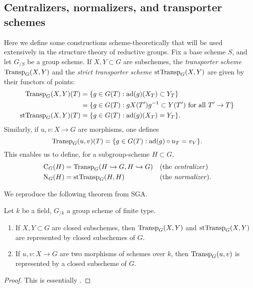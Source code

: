 \subsection{Centralizers, normalizers, and transporter schemes}

Here we define some constructions scheme-theoretically that will be used 
extensively in the structure theory of reductive groups. Fix a base scheme 
$S$, and let $G_{/S}$ be a group scheme. If $X,Y\subset G$ are subschemes, 
the \emph{transporter scheme} $\operatorname{Transp}_G(X,Y)$ and the \emph{strict 
transporter scheme} $\operatorname{stTransp}_G(X,Y)$ are given by their functors 
of points:
\begin{align*}
  \operatorname{Transp}_G(X,Y)(T) 
    &= \{g\in G(T): \operatorname{ad}(g)(X_T)\subset Y_T\} \\
    &= \{g\in G(T):g X(T') g^{-1}\subset Y(T')\text{ for all }T'\to T\} \\
  \operatorname{stTransp}_G(X,Y)(T) 
    &= \{g\in G(T):\operatorname{ad}(g)(X_T)=Y_T\} .
\end{align*}
Similarly, if $u,v:X\to G$ are morphisms, one defines 
\[
  \operatorname{Transp}_G(u,v)(T) = \{g\in G(T):\operatorname{ad}(g)\circ u_T=v_V\} .
\]
This enables us to define, for a subgroup-scheme $H\subset G$, 
\begin{align*}
  \operatorname{C}_G(H) &= \operatorname{Transp}_G(H\hookrightarrow G,H\hookrightarrow G) && \text{(the \emph{centralizer})}\\
  \operatorname{N}_G(H) &= \operatorname{stTransp}_G(H,H) && \text{(the \emph{normalizer})}.
\end{align*}

We reproduce the following theorem from SGA. 

\begin{theorem}
Let $k$ be a field, $G_{/k}$ a group scheme of finite type. 
\begin{enumerate}
\item If $X,Y\subset G$ are closed subschemes, then $\operatorname{Transp}_G(X,Y)$ and 
$\operatorname{stTransp}_G(X,Y)$ are represented by closed subschemes of $G$. 

\item If $u,v:X\to G$ are two morphisms of schemes over $k$, then 
$\operatorname{Transp}_G(u,v)$ is represented by a closed subscheme of $G$. 
\end{enumerate}
\end{theorem}
\begin{proof}
This is essentially \cite[VI\textsubscript{B} 6.2.5]{sga3-i}. 
\end{proof}

